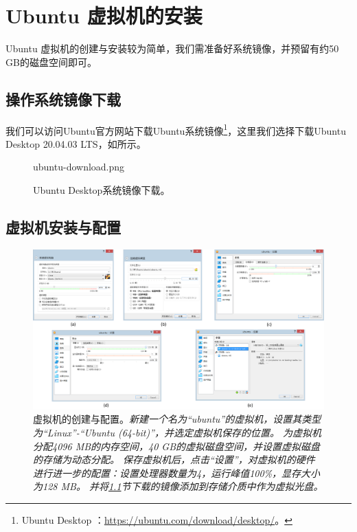 \documentclass[final]{cvpr}
\begin{document}
\section{Ubuntu 虚拟机的安装}\label{sec:ubuntu}

Ubuntu 虚拟机的创建与安装较为简单，我们需准备好系统镜像，并预留有约50 GB的磁盘空间即可。



\subsection{\textbf{操作系统镜像下载}}\label{sec:download-ubuntu-image}

我们可以访问Ubuntu官方网站下载Ubuntu系统镜像\footnote{Ubuntu Desktop ：\url{https://ubuntu.com/download/desktop/}。}，这里我们选择下载Ubuntu Desktop 20.04.03 LTS，如所示。

\begin{figure}
  	\begin{overpic}[width=\columnwidth]{ubuntu-download.png}\end{overpic}
    \caption{Ubuntu Desktop系统镜像下载。}\label{fig:ubuntu-download}
\end{figure}



\subsection{\textbf{虚拟机安装与配置}}


\begin{figure}[t]
  \centering
  \includegraphics[width=\textwidth]{ubuntu-i1.pdf}
  \caption{虚拟机的创建与配置。\textit{新建一个名为“ubuntu”的虚拟机，设置其类型为“Linux”-“Ubuntu (64-bit)”，并选定虚拟机保存的位置。
  为虚拟机分配4096 MB的内存空间，40 GB的虚拟磁盘空间，并设置虚拟磁盘的存储为动态分配。
  保存虚拟机后，点击“设置”，对虚拟机的硬件进行进一步的配置：设置处理器数量为4，运行峰值100\%，显存大小为128 MB。
  并将\ref{sec:download-ubuntu-image}节下载的镜像添加到存储介质中作为虚拟光盘。}}\label{fig:ubuntu-config}
\end{figure}
\end{document}
